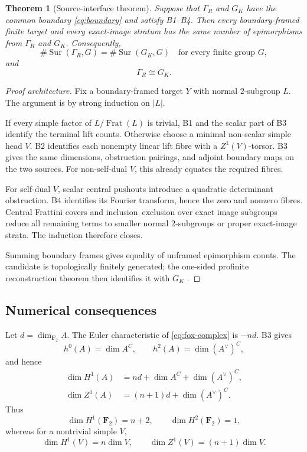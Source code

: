 \documentclass[11pt,reqno]{amsart}
\newtheorem{theorem}{Theorem}[section]
\theoremstyle{definition}
\theoremstyle{remark}
\numberwithin{equation}{section}
\newcommand{\F}{\mathbf F}
\newcommand{\Sur}{\operatorname{Sur}}
\newcommand{\Frat}{\operatorname{Frat}}
\begin{document}
\begin{theorem}[Source-interface theorem]\label{thm:source}
Suppose that \(\Gamma_R\) and \(G_K\) have the common boundary
\eqref{eq:boundary} and satisfy B1--B4.  Then every boundary-framed
finite target and every exact-image stratum has the same number of
epimorphisms from \(\Gamma_R\) and \(G_K\).  Consequently,
\[
 \#\Sur(\Gamma_R,G)=\#\Sur(G_K,G)
 \quad\text{for every finite group }G,
\]
and
\[
 \Gamma_R\cong G_K.
\]
\end{theorem}

\begin{proof}[Proof architecture]
Fix a boundary-framed target \(Y\) with normal \(2\)-subgroup \(L\).
The argument is by strong induction on \(|L|\).

If every simple factor of \(L/\Frat(L)\) is trivial, B1 and the scalar
part of B3 identify the terminal lift counts.  Otherwise choose a
minimal non-scalar simple head \(V\).  B2 identifies each nonempty
linear lift fibre with a \(Z^1(V)\)-torsor.  B3 gives the same
dimensions, obstruction pairings, and adjoint boundary maps on the two
sources.  For non-self-dual \(V\), this already equates the required
fibres.

For self-dual \(V\), scalar central pushouts introduce a quadratic
determinant obstruction.  B4 identifies its Fourier transform, hence
the zero and nonzero fibres.  Central Frattini covers and
inclusion--exclusion over exact image subgroups reduce all remaining
terms to smaller normal \(2\)-subgroups or proper exact-image strata.
The induction therefore closes.

Summing boundary frames gives equality of unframed epimorphism counts.
The candidate is topologically finitely generated; the one-sided
profinite reconstruction theorem then identifies it with \(G_K\)
\cite{DixonEtAl1982,RibesZalesskii,FriedJarden}.
\end{proof}

\subsection{Numerical consequences}

Let \(d=\dim_{\F_2}A\).  The Euler characteristic of
\eqref{eq:fox-complex} is \(-nd\).  B3 gives
\[
 h^0(A)=\dim A^C,\qquad h^2(A)=\dim(A^\vee)^C,
\]
and hence
\begin{align}
 \dim H^1(A)
 &=nd+\dim A^C+\dim(A^\vee)^C,\label{eq:h1dim}\\
 \dim Z^1(A)
 &=(n+1)d+\dim(A^\vee)^C.\label{eq:z1dim}
\end{align}
Thus
\[
 \dim H^1(\F_2)=n+2,\qquad \dim H^2(\F_2)=1,
\]
whereas for a nontrivial simple \(V\),
\[
 \dim H^1(V)=n\dim V,\qquad
 \dim Z^1(V)=(n+1)\dim V.
\]
\end{document}
